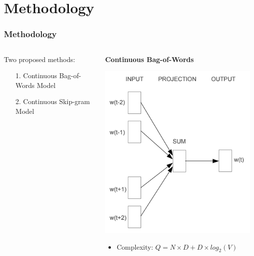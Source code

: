 \documentclass[aspectratio=169]{beamer}
\begin{document}
\section{Methodology}
\begin{frame}
\frametitle{Methodology}

\begin{columns}

\begin{column}{0.5\textwidth}
    Two proposed methods:

    \vskip 0.5in

    \begin{itemize}
        \item[1.] Continuous Bag-of-Words Model
        \item[2.] Continuous Skip-gram Model 
    \end{itemize}
\end{column}

\begin{column}{0.5\textwidth}

\begin{center}
    \textbf{Continuous Bag-of-Words}
\end{center}

\begin{center}
\includegraphics[scale=0.35]{cbow.png}
\end{center}

\begin{itemize}
    \item Complexity: $Q = N \times D + D \times log_2(V)$ %
\end{itemize}

\end{column}

\end{columns}

\end{frame}
\end{document}
